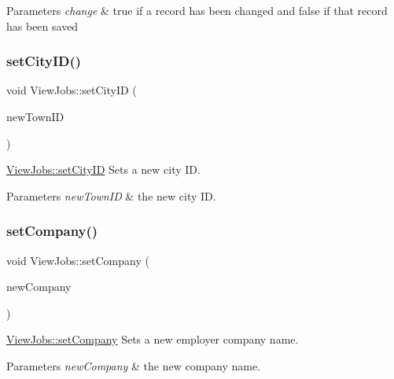 \begin{DoxyParams}{Parameters}
{\em change} & true if a record has been changed and false if that record has been saved \\
\hline
\end{DoxyParams}
\mbox{\label{class_view_jobs_ad89218b37af85cac9ce6c346efb57e56}} 
\subsubsection{\texorpdfstring{set\+City\+I\+D()}{setCityID()}}
{\footnotesize\ttfamily void View\+Jobs\+::set\+City\+ID (\begin{DoxyParamCaption}\item[{int}]{new\+Town\+ID }\end{DoxyParamCaption})}



\hyperlink{class_view_jobs_ad89218b37af85cac9ce6c346efb57e56}{View\+Jobs\+::set\+City\+ID} Sets a new city ID. 


\begin{DoxyParams}{Parameters}
{\em new\+Town\+ID} & the new city ID. \\
\hline
\end{DoxyParams}
\mbox{\label{class_view_jobs_a596246d07be66a5aeaf14ff8e5649290}} 
\subsubsection{\texorpdfstring{set\+Company()}{setCompany()}}
{\footnotesize\ttfamily void View\+Jobs\+::set\+Company (\begin{DoxyParamCaption}\item[{Q\+String}]{new\+Company }\end{DoxyParamCaption})}



\hyperlink{class_view_jobs_a596246d07be66a5aeaf14ff8e5649290}{View\+Jobs\+::set\+Company} Sets a new employer company name. 


\begin{DoxyParams}{Parameters}
{\em new\+Company} & the new company name. \\
\hline
\end{DoxyParams}
\mbox{\label{class_view_jobs_a7574794410eb40956f343976de97221f}} 
